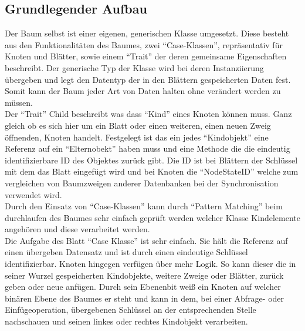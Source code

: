 \documentclass[a4paper,11pt,oneside,%
headsepline,												%
footsepline,												%
bibtotocnumbered									%
]{scrreprt}
\begin{document}
\subsection{Grundlegender Aufbau}
Der Baum selbst ist einer eigenen, generischen Klasse umgesetzt. Diese besteht aus den Funktionalitäten des Baumes, zwei \enquote{Case-Klassen}, repräsentativ für Knoten und Blätter, sowie einem \enquote{Trait} der deren gemeinsame Eigenschaften beschreibt. Der generische Typ der Klasse wird bei deren Instanziierung übergeben und legt den Datentyp der in den Blättern gespeicherten Daten fest. Somit kann der Baum jeder Art von Daten halten ohne verändert werden zu müssen.\\

Der \enquote{Trait} Child beschreibt was dass \enquote{Kind} eines Knoten können muss. Ganz gleich ob es sich hier um ein Blatt oder einen weiteren, einen neuen Zweig öffnenden, Knoten handelt. Festgelegt ist das ein jedes \enquote{Kindobjekt} eine Referenz auf ein \enquote{Elternobekt} haben muss und eine Methode die die eindeutig identifizierbare ID des Objektes zurück gibt. Die ID ist bei Blättern der Schlüssel mit dem das Blatt eingefügt wird und bei Knoten die \enquote{NodeStateID} welche zum vergleichen von Baumzweigen anderer Datenbanken bei der Synchronisation verwendet wird.\\

Durch den Einsatz von \enquote{Case-Klassen} kann durch \enquote{Pattern Matching} beim durchlaufen des Baumes sehr einfach geprüft werden welcher Klasse Kindelemente angehören und diese verarbeitet werden.\\

Die Aufgabe des Blatt \enquote{Case Klasse} ist sehr einfach. Sie hält die Referenz auf einen übergeben Datensatz und ist durch einen eindeutige Schlüssel identifizierbar. Knoten hingegen verfügen über mehr Logik. So kann dieser die in seiner Wurzel gespeicherten Kindobjekte, weitere Zweige oder Blätter, zurück geben oder neue anfügen. Durch sein Ebenenbit weiß ein Knoten auf welcher binären Ebene des Baumes er steht und kann in dem, bei einer Abfrage- oder Einfügeoperation, übergebenen Schlüssel an der entsprechenden Stelle nachschauen und seinen linkes oder rechtes Kindobjekt verarbeiten.
\end{document}
